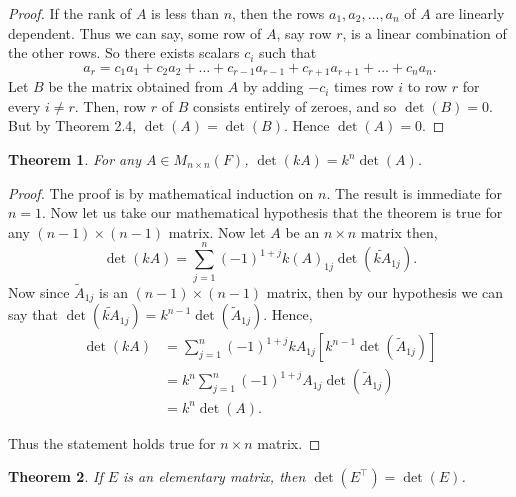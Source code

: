 \documentclass[12pt, a4paper]{article}
\newtheorem{theorem}{Theorem}[section]
\theoremstyle{definition}
\theoremstyle{remark}
\begin{document}
        \begin{proof}
        If the rank of $A$ is less than $n$, then the rows $a_1, a_2, \dots, a_n$ of $A$ are linearly dependent. Thus we can say, some row of $A$, say row $r$, is a linear combination of the other rows. So there exists scalars $c_i$ such that
        \[
        a_r = c_1 a_1 + c_2 a_2 + \dots + c_{r-1} a_{r-1} + c_{r+1} a_{r+1} + \dots + c_n a_n.
        \]
        Let $B$ be the matrix obtained from $A$ by adding $-c_i$ times row $i$ to row $r$ for every $i \neq r$. Then, row $r$ of $B$ consists entirely of zeroes, and so $\det(B) = 0$. But by Theorem 2.4, $\det(A) = \det(B)$. Hence $\det(A) = 0$.
        \end{proof}

        \begin{theorem}
        For any $A \in M_{n \times n}(F)$, $\det(kA) = k^n \det(A)$.
        \end{theorem}

        \begin{proof}
        The proof is by mathematical induction on $n$. The result is immediate for $n=1$. Now let us take our mathematical hypothesis that the theorem is true for any $(n-1) \times (n-1)$ matrix. Now let $A$ be an $n \times n$ matrix then,
        \[
        \det(kA) = \sum_{j=1}^{n} (-1)^{1+j} k(A)_{1j} \det(\widetilde{kA}_{1j}).
        \]
        Now since $\widetilde{A}_{1j}$ is an $(n-1) \times (n-1)$ matrix, then by our hypothesis we can say that $\det(\widetilde{kA}_{1j}) = k^{n-1} \det(\widetilde{A}_{1j})$. Hence,
        \begin{align*}
        \det(kA) &= \sum_{j=1}^{n} (-1)^{1+j} k A_{1j} \left[ k^{n-1} \det(\widetilde{A}_{1j}) \right] \\
        &= k^n \sum_{j=1}^{n} (-1)^{1+j} A_{1j} \det(\widetilde{A}_{1j}) \\
        &= k^n \det(A).
        \end{align*}

        Thus the statement holds true for $n \times n$ matrix.
        \end{proof}

        \begin{theorem}
        If $E$ is an elementary matrix, then $\det(E^\top) = \det(E)$.
        \end{theorem}
\end{document}
